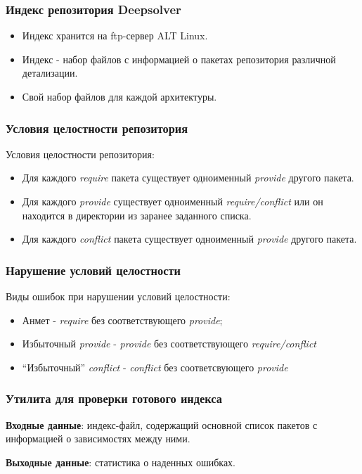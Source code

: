 \documentclass{beamer}
\begin{document}
\begin{frame}
\frametitle{Индекс репозитория Deepsolver}
\begin{itemize}
\item
Индекс хранится на ftp-сервер ALT Linux.
\item
Индекс - набор файлов с информацией о пакетах репозитория различной детализации.
\item
Свой набор файлов для каждой архитектуры.
\end{itemize}
\end{frame}

\begin{frame}
\frametitle{Условия целостности репозитория}
Условия целостности репозитория:
\begin{itemize}
\item{Для каждого \textit{require} пакета существует одноименный \textit{provide} 
другого пакета.}
\item{Для каждого \textit{provide} существует одноименный \textit{require/conflict} или
он находится в директории из заранее заданного списка.}
\item{Для каждого \textit{conflict} пакета существует одноименный \textit{provide}
другого пакета.}
\end{itemize}
\end{frame}

\begin{frame}
\frametitle{Нарушение условий целостности}
Виды ошибок при нарушении условий целостности:
\begin{itemize}
\item
Анмет - \textit{require} без соответствующего \textit{provide};
\item
Избыточный \textit{provide} - \textit{provide} без соответствующего \textit{require/conflict}
\item
``Избыточный'' \textit{conflict} - \textit{conflict} без соответсвующего \textit{provide}
\end{itemize}
\end{frame}

\begin{frame}
\frametitle{Утилита для проверки готового индекса}
\textbf{Входные данные}: индекс-файл, содержащий основной
список пакетов с информацией о 
зависимостях между ними.\\

\vspace{1cm}

\textbf{Выходные данные}: статистика о наденных ошибках.\\
\end{frame}
\end{document}

